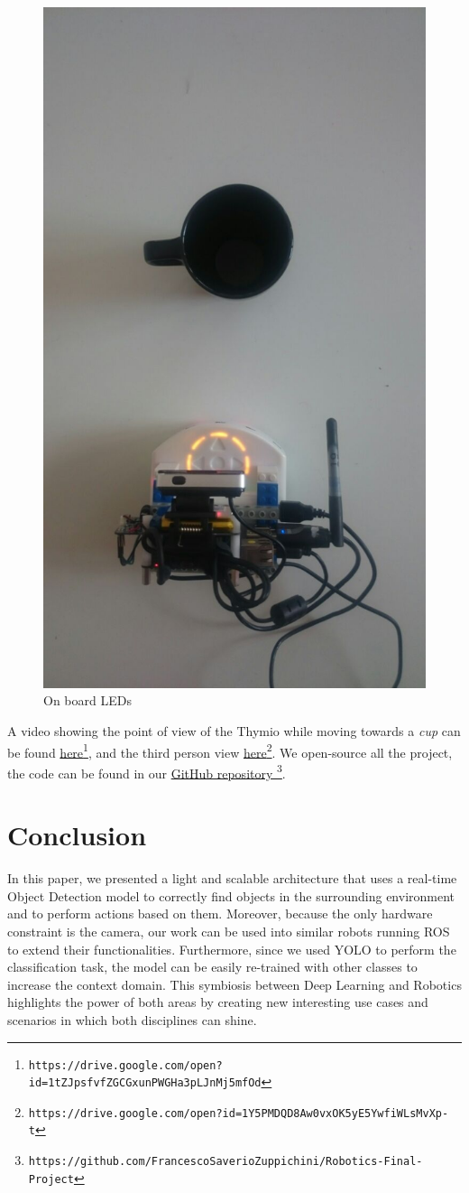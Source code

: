 \documentclass[letterpaper, 10 pt, conference]{ieeeconf}  %
\begin{document}
\begin{figure}[H]
\begin{center}
\includegraphics[width=0.25\linewidth]{images/leds/5}
\end{center}
\caption{On board LEDs}
\end{figure}
A video showing the point of view of the Thymio while moving towards a \emph{cup} can be found \href{https://drive.google.com/open?id=1tZJpsfvfZGCGxunPWGHa3pLJnMj5mfOd}{here}\footnote{\texttt{https://drive.google.com/open?id=1tZJpsfvfZGCGxunPWGHa3pLJnMj5mfOd}}, and the third person view \href{https://drive.google.com/open?id=1Y5PMDQD8Aw0vxOK5yE5YwfiWLsMvXp-t}{here}\footnote{\texttt{https://drive.google.com/open?id=1Y5PMDQD8Aw0vxOK5yE5YwfiWLsMvXp-t}}. We open-source all the project, the code can be found in our \href{https://github.com/FrancescoSaverioZuppichini/Robotics-Final-Project}{GitHub repository }\footnote{\texttt{https://github.com/FrancescoSaverioZuppichini/Robotics-Final-Project}}.

\section{Conclusion}
In this paper, we presented a light and scalable architecture that uses a real-time Object Detection model to correctly find objects in the surrounding environment and to perform actions based on them. Moreover, because the only  hardware constraint is the camera, our work can be used into similar robots running ROS  to extend their functionalities. Furthermore, since we used YOLO to perform the classification task, the model can be easily re-trained with other classes to increase the context domain. This symbiosis between Deep Learning and Robotics highlights the power of both areas by creating new interesting use cases and scenarios in which both disciplines can shine.

\printbibliography

%
\end{document}
